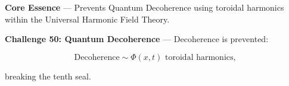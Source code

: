 
\textbf{Core Essence} --- Prevents Quantum Decoherence using toroidal harmonics within the Universal Harmonic Field Theory.

\textbf{Challenge 50: Quantum Decoherence} --- Decoherence is prevented:

$$
\text{Decoherence} \sim \Phi(x, t) \text{ toroidal harmonics,}
$$

breaking the tenth seal.

